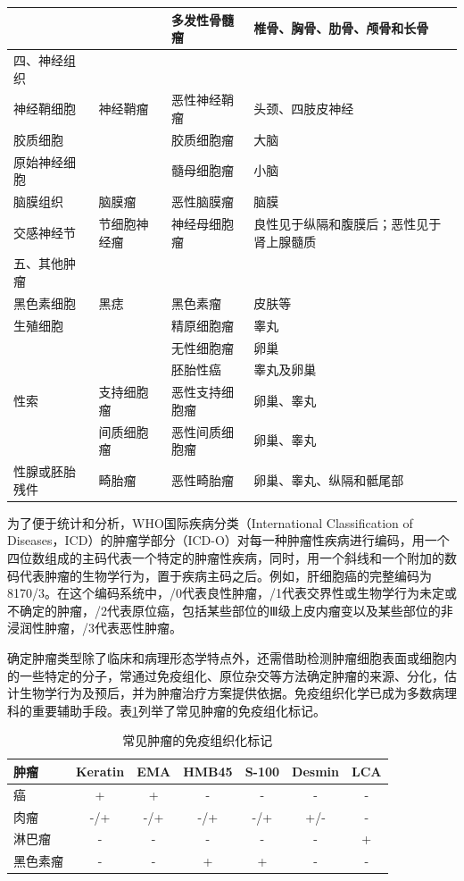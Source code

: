 \begin{longtable}[]{lp{3cm}p{3cm}p{3cm}}
&&多发性骨髓瘤&椎骨、胸骨、肋骨、颅骨和长骨
\\\hline
四、神经组织&&&
\\\hline
\quad 神经鞘细胞&神经鞘瘤&恶性神经鞘瘤&头颈、四肢皮神经
\\\hline
\quad 胶质细胞&&胶质细胞瘤&大脑
\\\hline
\quad 原始神经细胞&&髓母细胞瘤&小脑
\\\hline
\quad 脑膜组织&脑膜瘤&恶性脑膜瘤&脑膜
\\\hline
\quad 交感神经节&节细胞神经瘤&神经母细胞瘤&良性见于纵隔和腹膜后；恶性见于肾上腺髓质
\\\hline
五、其他肿瘤&&&
\\\hline
\quad 黑色素细胞&黑痣&黑色素瘤&皮肤等
\\\hline
\quad 生殖细胞&&精原细胞瘤&睾丸
\\\hline
&&无性细胞瘤&卵巢
\\\hline
&&胚胎性癌&睾丸及卵巢
\\\hline
\quad 性索&支持细胞瘤&恶性支持细胞瘤&卵巢、睾丸
\\\hline
&间质细胞瘤&恶性间质细胞瘤&卵巢、睾丸
\\\hline
\quad 性腺或胚胎残件&畸胎瘤&恶性畸胎瘤&卵巢、睾丸、纵隔和骶尾部
\\
\bottomrule
\end{longtable}


为了便于统计和分析，WHO国际疾病分类（International Classification of
Diseases，ICD）的肿瘤学部分（ICD-O）对每一种肿瘤性疾病进行编码，用一个四位数组成的主码代表一个特定的肿瘤性疾病，同时，用一个斜线和一个附加的数码代表肿瘤的生物学行为，置于疾病主码之后。例如，肝细胞癌的完整编码为8170/3。在这个编码系统中，/0代表良性肿瘤，/1代表交界性或生物学行为未定或不确定的肿瘤，/2代表原位癌，包括某些部位的Ⅲ级上皮内瘤变以及某些部位的非浸润性肿瘤，/3代表恶性肿瘤。

确定肿瘤类型除了临床和病理形态学特点外，还需借助检测肿瘤细胞表面或细胞内的一些特定的分子，常通过免疫组化、原位杂交等方法确定肿瘤的来源、分化，估计生物学行为及预后，并为肿瘤治疗方案提供依据。免疫组织化学已成为多数病理科的重要辅助手段。表\ref{tab5-2}列举了常见肿瘤的免疫组化标记。

\begin{table}[ht]
    \caption{常见肿瘤的免疫组织化标记}
    \label{tab5-2}
    \centering
    \begin{tabular}{lcccccc}
    \toprule
    肿瘤 & Keratin & EMA & HMB45 & S-100 & Desmin & LCA\\
    \midrule
    癌 & + & + & - & -&-&-\\
    肉瘤&-/+&-/+&-/+&-/+&+/-&-\\
    淋巴瘤&-&-&-&-&-&+\\
    黑色素瘤&-&-&+&+&-&-\\
    \bottomrule
    \end{tabular}
  \end{table}

